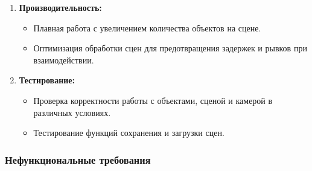 \begin{enumerate}
    \item \textbf{Производительность:}
    \begin{itemize}
        \item Плавная работа с увеличением количества объектов на сцене.
        \item Оптимизация обработки сцен для предотвращения задержек и рывков при взаимодействии.
    \end{itemize}
    
    \item \textbf{Тестирование:}
    \begin{itemize}
        \item Проверка корректности работы с объектами, сценой и камерой в различных условиях.
        \item Тестирование функций сохранения и загрузки сцен.
    \end{itemize}
\end{enumerate}

\subsubsection{Нефункциональные требования}

